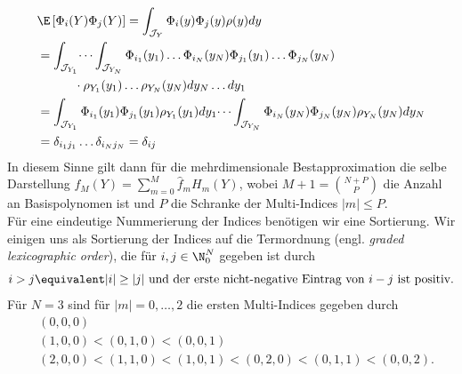 \begin{equation}
\label{eqn:gpc_ortho_mv}
\begin{split}
&\E\left[\Phi_i(Y)\Phi_j(Y)\right]=\int_{\mathcal{J}_Y} \Phi_i(y)\Phi_j(y)\rho(y)dy\\
&=\int_{\mathcal{J}_{Y_1}}\dots\int_{\mathcal{J}_{Y_N}}\Phi_{i_1}(y_1)\dots\Phi_{i_N}(y_N)\Phi_{j_1}(y_1)\dots\Phi_{j_N}(y_N)\\
&\qquad\quad\cdot\rho_{Y_1}(y_1)\dots\rho_{Y_N}(y_N)dy_N\dots dy_1\\
&=\int_{\mathcal{J}_{Y_1}}\Phi_{i_1}(y_1)\Phi_{j_1}(y_1)\rho_{Y_1}(y_1)dy_1\dots\int_{\mathcal{J}_{Y_N}}\Phi_{i_N}(y_N)\Phi_{j_N}(y_N)\rho_{Y_N}(y_N)dy_N\\
&=\delta_{i_1j_1}\dots \delta_{i_Nj_N}=\delta_{ij}
\end{split}
\end{equation}
In diesem Sinne gilt dann für die mehrdimensionale Bestapproximation die selbe Darstellung $f_M(Y)=\sum_{m=0}^M\hat{f}_mH_m(Y)$, wobei $M+1=\binom{N+P}{P}$ die Anzahl an Basispolynomen ist und $P$ die Schranke der Multi-Indices $|m|\le P$.\\
Für eine eindeutige Nummerierung der Indices benötigen wir eine Sortierung. Wir einigen uns als Sortierung der Indices auf die Termordnung (engl. \emph{graded lexicographic order}), die für $i,j\in\N_0^N$ gegeben ist durch 
\[i>j \equivalent |i|\ge |j| \text{ und der erste nicht-negative Eintrag von } i-j \text { ist positiv}.\]
Für $N=3$ sind für $|m|=0,\dots,2$ die ersten Multi-Indices gegeben durch
\begin{align*}
&(0,0,0)\\
&(1,0,0)<(0,1,0)<(0,0,1)\\
&(2,0,0)<(1,1,0)<(1,0,1)<(0,2,0)<(0,1,1)<(0,0,2).\\
\end{align*}
